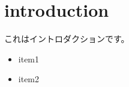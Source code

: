 \documentclass{jsarticle}
\begin{document}
\section{introduction}
これはイントロダクションです。
\begin{itemize}
\item item1
\item item2
  \end{itemize}
\end{document}
